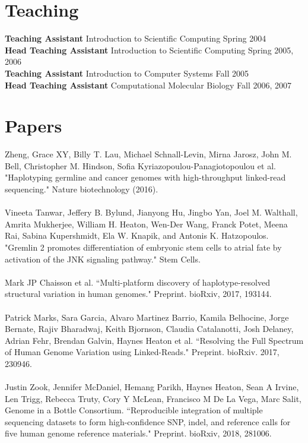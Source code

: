 \documentclass[margin]{res}
\begin{document}
\begin{resume}
\section{Teaching}
{\bf Teaching Assistant} Introduction to Scientific Computing \hfill  Spring 2004 \\
{\bf Head Teaching Assistant} Introduction to Scientific Computing \hfill Spring 2005, 2006 \\
{\bf Teaching Assistant} Introduction to Computer Systems \hfill Fall 2005 \\
{\bf Head Teaching Assistant} Computational Molecular Biology \hfill Fall 2006, 2007 

\section{Papers}
Zheng, Grace XY, Billy T. Lau, Michael Schnall-Levin, Mirna Jarosz, John M. Bell, Christopher M. Hindson, Sofia Kyriazopoulou-Panagiotopoulou et al. "Haplotyping germline and cancer genomes with high-throughput linked-read sequencing." Nature biotechnology (2016).  
\\ \\
Vineeta Tanwar, Jeffery B. Bylund, Jianyong Hu, Jingbo Yan, Joel M. Walthall, Amrita Mukherjee, William H. Heaton, Wen-Der Wang, Franck Potet, Meena Rai, Sabina Kupershmidt, Ela W. Knapik, and Antonis K. Hatzopoulos. "Gremlin 2 promotes differentiation of embryonic stem cells to atrial fate by activation of the JNK signaling pathway." Stem Cells. 
\\ \\
Mark JP Chaisson et al. ``Multi-platform discovery of haplotype-resolved structural variation in human genomes." Preprint. bioRxiv, 2017, 193144.
\\ \\
Patrick Marks, Sara Garcia, Alvaro Martinez Barrio, Kamila Belhocine, Jorge Bernate, Rajiv Bharadwaj, Keith Bjornson, Claudia Catalanotti, Josh Delaney, Adrian Fehr, Brendan Galvin, Haynes Heaton et al. ``Resolving the Full Spectrum of Human Genome Variation using Linked-Reads." Preprint. bioRxiv. 2017, 230946.
\\ \\
Justin Zook, Jennifer McDaniel, Hemang Parikh, Haynes Heaton, Sean A Irvine, Len Trigg, Rebecca Truty, Cory Y McLean, Francisco M De La Vega, Marc Salit, Genome in a Bottle Consortium. ``Reproducible integration of multiple sequencing datasets to form high-confidence SNP, indel, and reference calls for five human genome reference materials." Preprint. bioRxiv, 2018, 281006.

\end{resume}
\end{document}
